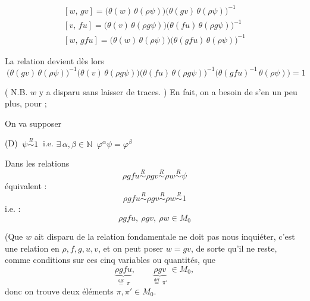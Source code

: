 \documentclass[11pt,a4paper]{article}
\begin{document}
\[
  \begin{array}{l}
    [w,\, gv] = \bigl(\theta(w)\,\theta(\rho\psi)\bigr)\bigl(\theta(gv)\,\theta(\rho\psi)\bigr)^{-1} \\
    {}[v,\, fu] = \bigl(\theta(v)\,\theta(\rho g\psi)\bigr)\bigl(\theta(fu)\,\theta(\rho g\psi)\bigr)^{-1} \\
    {}[w,\, gfu] = \bigl(\theta(w)\,\theta(\rho\psi)\bigr)\bigl(\theta(gfu)\,\theta(\rho\psi)\bigr)^{-1}
  \end{array}
\]

La relation devient dès lors
\[
  \boxed{\ \bigl(\theta(gv)\,\theta(\rho\psi)\bigr)^{-1}
  \bigl(\theta(v)\,\theta(\rho g\psi)\bigr)
  \bigl(\theta(fu)\,\theta(\rho g\psi)\bigr)^{-1}
  \bigl(\theta(gfu)^{-1}\,\theta(\rho\psi)\bigr) = 1\ }
\]


( N.B. $w$ y a disparu sans laisser de traces. ) En fait, on a besoin de s'en
\ill{} un peu plus, pour \ill{} ; \ill{}


On va supposer


(D) $\boxed{\ \psi \overset{R}{\sim} 1\ }$ i.e. $\exists\, \alpha,\beta \in \mathbb{N}$
\ill{} $\boxed{\ \varphi^{\alpha}\psi = \varphi^{\beta}\ }$


Dans les relations
\[
  \rho g f u \overset{R}{\sim} \rho g v \overset{R}{\sim} \rho w \overset{R}{\sim} \psi
\]
équivalent :
\[
  \rho g f u \overset{R}{\sim} \rho g v \overset{R}{\sim} \rho w \overset{R}{\sim} 1
\]
i.e. :
\[
  \boxed{\ \rho g f u,\ \rho g v,\ \rho w \in M_0\ }
\]

(Que $w$ ait disparu de la relation fondamentale ne doit pas nous inquiéter,
c'est une relation en  $\rho, f, g, u, v$, et on peut
poser $w = gv$, de sorte qu'il ne reste, comme conditions sur ces cinq variables
ou quantités, que
\[
  \underbrace{\rho g f u}_{\overset{\text{déf}}{=}\ \pi},\qquad
  \underbrace{\rho g v}_{\overset{\text{déf}}{=}\ \pi'} \ \in M_0 ,
\]
donc on trouve deux éléments $\pi, \pi' \in M_0$.
\end{document}
